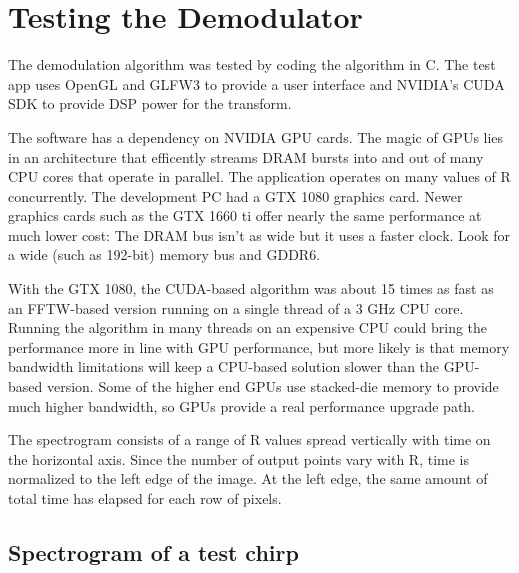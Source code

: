 \section{Testing the Demodulator}

The demodulation algorithm was tested by coding the algorithm in C.
The test app uses OpenGL and GLFW3 to provide a user interface and NVIDIA's
CUDA SDK to provide DSP power for the transform.

The software has a dependency on NVIDIA GPU cards.
The magic of GPUs lies in an architecture that efficently streams DRAM bursts
into and out of many CPU cores that operate in parallel.
The application operates on many values of R concurrently.
The development PC had a GTX 1080 graphics card.
Newer graphics cards such as the GTX 1660 ti offer nearly the same performance
at much lower cost: The DRAM bus isn't as wide but it uses a faster clock.
Look for a wide (such as 192-bit) memory bus and GDDR6.

With the GTX 1080, the CUDA-based algorithm was about 15 times as fast as an
FFTW-based version running on a single thread of a 3 GHz CPU core.
Running the algorithm in many threads on an expensive CPU could bring the
performance more in line with GPU performance,
but more likely is that memory bandwidth limitations will keep a CPU-based
solution slower than the GPU-based version.
Some of the higher end GPUs use stacked-die memory to provide much higher
bandwidth, so GPUs provide a real performance upgrade path.

The spectrogram consists of a range of R values spread vertically with time on
the horizontal axis.
Since the number of output points vary with R, time is normalized to the left 
edge of the image. At the left edge, the same amount of total time has elapsed
for each row of pixels.

\subsection{Spectrogram of a test chirp}

